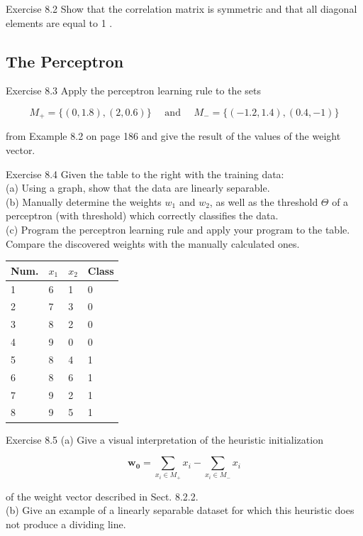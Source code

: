 \documentclass[10pt]{book}
\begin{document}
Exercise 8.2 Show that the correlation matrix is symmetric and that all diagonal elements are equal to 1 .

\subsection{The Perceptron}
Exercise 8.3 Apply the perceptron learning rule to the sets


$$
M_{+}=\{(0,1.8),(2,0.6)\} \quad \text { and } \quad M_{-}=\{(-1.2,1.4),(0.4,-1)\}
$$

from Example 8.2 on page 186 and give the result of the values of the weight vector.

Exercise 8.4 Given the table to the right with the training data:\\
(a) Using a graph, show that the data are linearly separable.\\
(b) Manually determine the weights $w_{1}$ and $w_{2}$, as well as the threshold $\Theta$ of a perceptron (with threshold) which correctly classifies the data.\\
(c) Program the perceptron learning rule and apply your program to the table. Compare the discovered weights with the manually calculated ones.

\begin{center}
\begin{tabular}{llll}
\hline
Num. & $x_{1}$ & $x_{2}$ & Class \\
\hline
1 & 6 & 1 & 0 \\
\hline
2 & 7 & 3 & 0 \\
\hline
3 & 8 & 2 & 0 \\
\hline
4 & 9 & 0 & 0 \\
\hline
5 & 8 & 4 & 1 \\
\hline
6 & 8 & 6 & 1 \\
\hline
7 & 9 & 2 & 1 \\
\hline
8 & 9 & 5 & 1 \\
\hline
\end{tabular}
\end{center}

Exercise 8.5
(a) Give a visual interpretation of the heuristic initialization

$$
\boldsymbol{w}_{\mathbf{0}}=\sum_{x_{i} \in M_{+}} x_{i}-\sum_{x_{i} \in M_{-}} x_{i}
$$

of the weight vector described in Sect. 8.2.2.\\
(b) Give an example of a linearly separable dataset for which this heuristic does not produce a dividing line.
\end{document}
